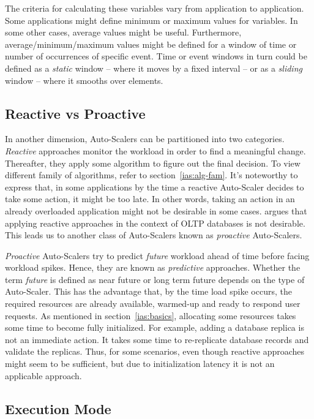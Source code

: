 The criteria for calculating these variables vary from application to application. Some applications might define minimum or maximum values for variables. In some other cases, average values might be useful. Furthermore, average/minimum/maximum values might be defined for a window of time or number of occurrences of specific event. Time or event windows in turn could be defined as a \emph{static} window -- where it moves by a fixed interval -- or as a \emph{sliding} window -- where it smooths over elements.
\subsection{Reactive vs Proactive}
\label{ias:react-proact}

In another dimension, Auto-Scalers can be partitioned into two categories. \emph{Reactive} approaches monitor the workload in order to find a meaningful change. Thereafter, they apply some algorithm to figure out the final decision. To view different family of algorithms, refer to section~\ref{ias:alg-fam}. It's noteworthy to express that, in some applications by the time a reactive Auto-Scaler decides to take some action, it might be too late. In other words, taking an action in an already overloaded application might not be desirable in some cases. \textcite{Taft:2018} argues that applying reactive approaches in the context of OLTP databases is not desirable. This leads us to another class of Auto-Scalers known as \emph{proactive} Auto-Scalers.

\emph{Proactive} Auto-Scalers try to predict \emph{future} workload ahead of time before facing workload spikes. Hence, they are known as \emph{predictive} approaches. Whether the term \emph{future} is defined as near future or long term future depends on the type of Auto-Scaler. This has the advantage that, by the time load spike occurs, the required resources are already available, warmed-up and ready to respond user requests. As mentioned in section~\ref{ias:basics}, allocating some resources takes some time to become fully initialized. For example, adding a database replica is not an immediate action. It takes some time to re-replicate database records and validate the replicas. Thus, for some scenarios, even though reactive approaches might seem to be sufficient, but due to initialization latency it is not an applicable approach.

\subsection{Execution Mode}
\label{ias:exec-mode}

